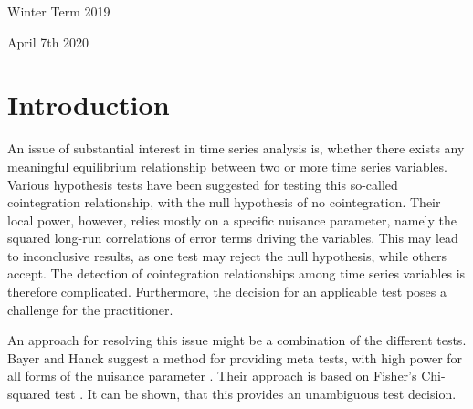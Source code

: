 \documentclass[11pt,a4paper]{article}
\begin{document}
\begin{titlepage}
  \noindent\begin{minipage}[t]{0.5\textwidth}
  \end{minipage}
  \begin{minipage}[t]{0.7\textwidth}
  \hspace{1cm}Winter Term 2019
  \end{minipage}

  \noindent\begin{minipage}[t]{0.5\textwidth}
  \end{minipage}
  \begin{minipage}[t]{0.7\textwidth}
  \hspace{1cm}April 7th 2020
  \end{minipage}

\end{titlepage}

\restoregeometry


{
\hypersetup{linkcolor=black}
\setcounter{tocdepth}{3}
\tableofcontents
}
\newpage
\listoftables
\newpage
\listoffigures
\newpage
{} 
\hypertarget{introduction}{%
\section{Introduction}\label{introduction}}

An issue of substantial interest in time series analysis is, whether
there exists any meaningful equilibrium relationship between two or more
time series variables. Various hypothesis tests have been suggested for
testing this so-called cointegration relationship, with the null
hypothesis of no cointegration. Their local power, however, relies
mostly on a specific nuisance parameter, namely the squared long-run
correlations of error terms driving the variables. This may lead to
inconclusive results, as one test may reject the null hypothesis, while
others accept. The detection of cointegration relationships among time
series variables is therefore complicated. Furthermore, the decision for
an applicable test poses a challenge for the practitioner.

An approach for resolving this issue might be a combination of the
different tests. Bayer and Hanck suggest a method for providing meta
tests, with high power for all forms of the nuisance parameter
\autocite{Bayerhanck2009}. Their approach is based on Fisher's
Chi-squared test \autocite{Fisher1925}. It can be shown, that this
provides an unambiguous test decision.
\end{document}
